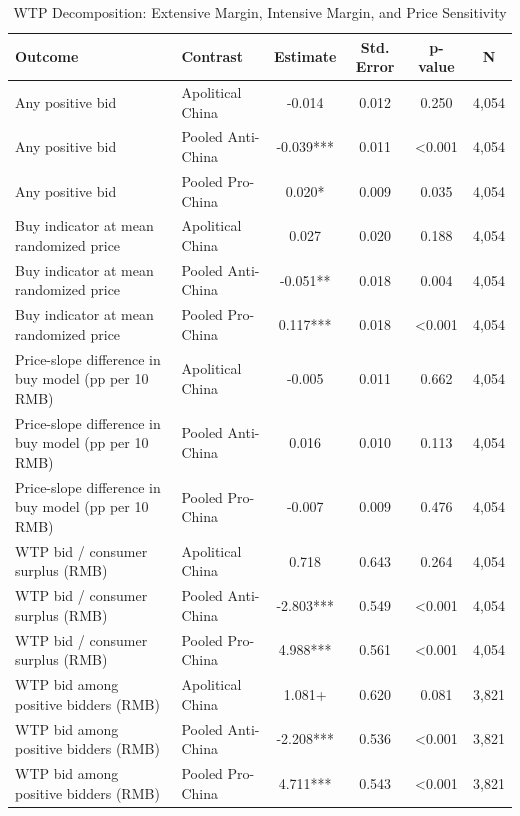 \begin{table}[H]
\centering
\caption{WTP Decomposition: Extensive Margin, Intensive Margin, and Price Sensitivity}
\label{tab:wtp_decomposition}
\footnotesize
\begin{threeparttable}
\begin{tabular}{llcccc}
\toprule
Outcome & Contrast & Estimate & Std. Error & p-value & N \\
\midrule
Any positive bid & Apolitical China & -0.014 & 0.012 & 0.250 & 4,054 \\
Any positive bid & Pooled Anti-China & -0.039*** & 0.011 & <0.001 & 4,054 \\
Any positive bid & Pooled Pro-China & 0.020* & 0.009 & 0.035 & 4,054 \\
Buy indicator at mean randomized price & Apolitical China & 0.027 & 0.020 & 0.188 & 4,054 \\
Buy indicator at mean randomized price & Pooled Anti-China & -0.051** & 0.018 & 0.004 & 4,054 \\
Buy indicator at mean randomized price & Pooled Pro-China & 0.117*** & 0.018 & <0.001 & 4,054 \\
Price-slope difference in buy model (pp per 10 RMB) & Apolitical China & -0.005 & 0.011 & 0.662 & 4,054 \\
Price-slope difference in buy model (pp per 10 RMB) & Pooled Anti-China & 0.016 & 0.010 & 0.113 & 4,054 \\
Price-slope difference in buy model (pp per 10 RMB) & Pooled Pro-China & -0.007 & 0.009 & 0.476 & 4,054 \\
WTP bid / consumer surplus (RMB) & Apolitical China & 0.718 & 0.643 & 0.264 & 4,054 \\
WTP bid / consumer surplus (RMB) & Pooled Anti-China & -2.803*** & 0.549 & <0.001 & 4,054 \\
WTP bid / consumer surplus (RMB) & Pooled Pro-China & 4.988*** & 0.561 & <0.001 & 4,054 \\
WTP bid among positive bidders (RMB) & Apolitical China & 1.081+ & 0.620 & 0.081 & 3,821 \\
WTP bid among positive bidders (RMB) & Pooled Anti-China & -2.208*** & 0.536 & <0.001 & 3,821 \\
WTP bid among positive bidders (RMB) & Pooled Pro-China & 4.711*** & 0.543 & <0.001 & 3,821 \\
\bottomrule
\end{tabular}
\begin{tablenotes}[flushleft]
\footnotesize

\end{tablenotes}
\end{threeparttable}
\end{table}
